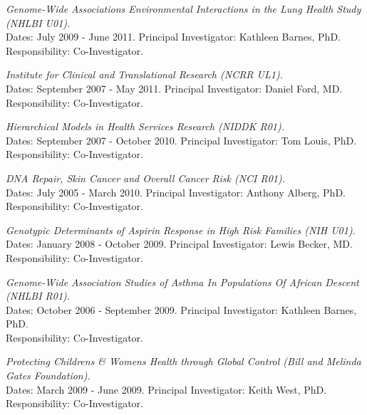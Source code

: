 \documentclass[10pt]{article}
\newcommand{\dn}[1]{{\color{black} {#1}}}
\begin{document}
\item
{\it Genome-Wide Associations Environmental Interactions in the Lung Health Study (NHLBI U01).}\\[0.0em]
\dn{Dates:} July 2009 - June 2011.
\dn{Principal Investigator:} Kathleen Barnes, PhD.\\
\dn{Responsibility:} Co-Investigator.

\item
{\it Institute for Clinical and Translational Research (NCRR UL1).}\\[0.0em]
\dn{Dates:} September 2007 - May 2011.
\dn{Principal Investigator:} Daniel Ford, MD.\\
\dn{Responsibility:} Co-Investigator.

\item
{\it Hierarchical Models in Health Services Research (NIDDK R01).}\\[0.0em]
\dn{Dates:} September 2007 - October 2010.
\dn{Principal Investigator:} Tom Louis, PhD.\\
\dn{Responsibility:} Co-Investigator.

\item
{\it DNA Repair, Skin Cancer and Overall Cancer Risk (NCI R01).}\\[0.0em]
\dn{Dates:} July 2005 - March 2010.
\dn{Principal Investigator:} Anthony Alberg, PhD.\\
\dn{Responsibility:} Co-Investigator.

\item
{\it Genotypic Determinants of Aspirin Response in High Risk Families (NIH U01).}\\[0.0em]
\dn{Dates:} January 2008 - October 2009.
\dn{Principal Investigator:} Lewis Becker, MD.\\
\dn{Responsibility:} Co-Investigator.

\item
{\it Genome-Wide Association Studies of Asthma In Populations Of African Descent (NHLBI R01).}\\[0.0em]
\dn{Dates:} October 2006 - September 2009.
\dn{Principal Investigator:} Kathleen Barnes, PhD.\\
\dn{Responsibility:} Co-Investigator.

\item
{\it Protecting Childrens \& Womens Health through Global Control (Bill and Melinda Gates Foundation).}\\[0.0em]
\dn{Dates:} March 2009 - June 2009.
\dn{Principal Investigator:} Keith West, PhD.\\
\dn{Responsibility:} Co-Investigator.
\end{document}
